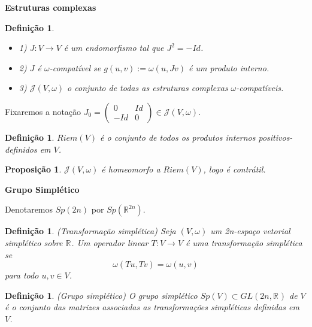 \documentclass{beamer}
\newcommand{\titulo}[1]{\centering \textbf{#1}}
\newtheorem{definicao}[teorema]{Definição}
\newtheorem{proposicao}[teorema]{Proposição}
\newcommand{\estruturacomplexa}{J_{0}}
\newcommand{\estruturascomplexaspadrao}{\mathcal{J}(V, \omega)}
\newcommand{\formaSimpletica}[2]{\omega(#1, #2)}
\newcommand{\generalgroup}[2]{GL(#1, #2)}
\newcommand{\generalgroupreal}[1]{\generalgroup{#1}{\real{}}}
\newcommand{\gruposimpletico}[1]{Sp(#1)}
\newcommand{\produtosinternos}[1]{Riem(#1)}
\newcommand{\real}[1]{\mathbb{R}^{#1}}
\newcommand{\reta}{\real{}}
\begin{document}
\begin{frame}
	\titulo{Estruturas complexas}
	
	\begin{definicao}
		\begin{itemize}
			\item 1) $J: V \to V$ é um endomorfismo tal que $J^{2} = -Id$. 
			
			\item 2) $J$ é $\omega$-compatível se $g(u,v):=\omega(u, Jv)$ é um produto interno. 
			
			\item 3) $\estruturascomplexaspadrao$ o conjunto de todas as estruturas complexas $\omega$-compatíveis.
		\end{itemize}
	\end{definicao}
	
	Fixaremos a notação
		$
		\estruturacomplexa=
		\left(
		\begin{array}{cc}
		0 & Id
		\\
		-Id & 0
		\end{array}
		\right) \in \estruturascomplexaspadrao .
		$
		
	
	\begin{definicao}
		$\produtosinternos{V}$ é o conjunto de todos os produtos internos positivos-definidos em $V$.
	\end{definicao}
	
	\begin{proposicao}
		$\estruturascomplexaspadrao$ é homeomorfo a $\produtosinternos{V}$, logo é contrátil.
	\end{proposicao}
	
\end{frame}

\begin{frame}
	\titulo{Grupo Simplético}
	
	Denotaremos $\gruposimpletico{2n}$ por $\gruposimpletico{\real{2n}}$.
	
	\begin{definicao}
		(Transformação simplética) Seja $(V, \omega)$ um 2n-espaço vetorial simplético sobre $\reta$. Um operador linear $T: V \to V$ é uma transformação simplética se 
		$$
		\formaSimpletica{Tu}{Tv} = \formaSimpletica{u}{v}
		$$ para todo $u,v\in V$.
	\end{definicao}
	
	\begin{definicao}
		(Grupo simplético) O grupo simplético $\gruposimpletico{V} \subset \generalgroupreal{2n}$ de $V$ é o conjunto das matrizes associadas as transformações simpléticas definidas em $V$.
	\end{definicao}	
\end{frame}
\end{document}
